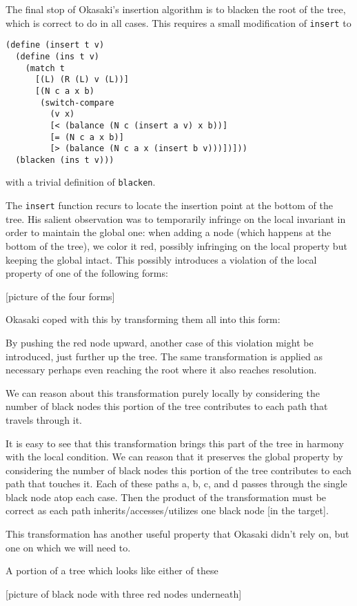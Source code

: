 \documentclass[preprint]{sigplanconf}
\begin{document}
The final stop of Okasaki's insertion algorithm is to blacken the root of the tree, which is correct to do in all cases. This requires a small modification of \texttt{insert} to 
\begin{verbatim}
(define (insert t v)
  (define (ins t v)
    (match t
      [(L) (R (L) v (L))]
      [(N c a x b)
       (switch-compare
         (v x)
         [< (balance (N c (insert a v) x b))]
         [= (N c a x b)]
         [> (balance (N c a x (insert b v)))])]))
  (blacken (ins t v)))
\end{verbatim}
with a trivial definition of \texttt{blacken}.

The \texttt{insert} function recurs to locate the insertion point at the bottom of the tree.
His salient observation was to temporarily infringe on the local invariant in order to maintain the global one: when adding a node (which happens at the bottom of the tree), we color it red, possibly infringing on the local property but keeping the global intact. This possibly introduces a violation of the local property of one of the following forms:

[picture of the four forms]

Okasaki coped with this by transforming them all into this form:

By pushing the red node upward, another case of this violation might be introduced, just further up the tree. The same transformation is applied as necessary perhaps even reaching the root where it also reaches resolution.

We can reason about this transformation purely locally by considering the number of black nodes this portion of the tree contributes to each path that travels through it.

It is easy to see that this transformation brings this part of the tree in harmony with the local condition. We can reason that it preserves the global property by considering the number of black nodes this portion of the tree contributes to each path that touches it. Each of these paths a, b, c, and d passes through the single black node atop each case. Then the product of the transformation must be correct as each path inherits/accesses/utilizes one black node [in the target].

This transformation has another useful property that Okasaki didn't rely on, but one on which we will need to.

A portion of a tree which looks like either of these

[picture of black node with three red nodes underneath]
\end{document}
